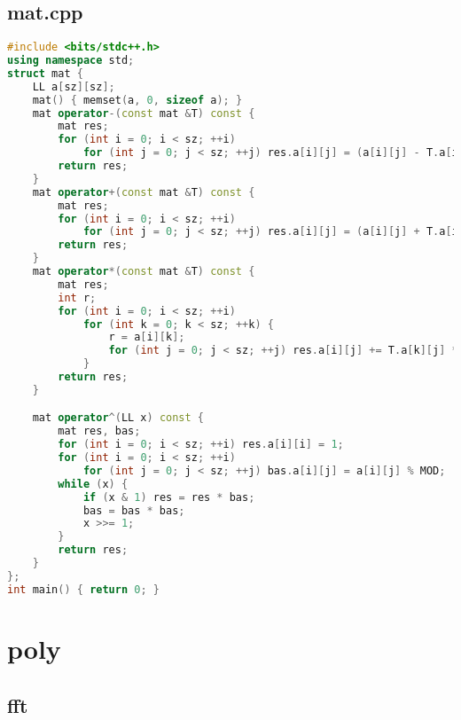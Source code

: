 \documentclass[9pt, a4paper, oneside]{book}
\begin{document}
\subsection{mat.cpp}
\begin{lstlisting}[language={C++}]
#include <bits/stdc++.h>
using namespace std;
struct mat {
    LL a[sz][sz];
    mat() { memset(a, 0, sizeof a); }
    mat operator-(const mat &T) const {
        mat res;
        for (int i = 0; i < sz; ++i)
            for (int j = 0; j < sz; ++j) res.a[i][j] = (a[i][j] - T.a[i][j]) % MOD;
        return res;
    }
    mat operator+(const mat &T) const {
        mat res;
        for (int i = 0; i < sz; ++i)
            for (int j = 0; j < sz; ++j) res.a[i][j] = (a[i][j] + T.a[i][j]) % MOD;
        return res;
    }
    mat operator*(const mat &T) const {
        mat res;
        int r;
        for (int i = 0; i < sz; ++i)
            for (int k = 0; k < sz; ++k) {
                r = a[i][k];
                for (int j = 0; j < sz; ++j) res.a[i][j] += T.a[k][j] * r, res.a[i][j] %= MOD;
            }
        return res;
    }

    mat operator^(LL x) const {
        mat res, bas;
        for (int i = 0; i < sz; ++i) res.a[i][i] = 1;
        for (int i = 0; i < sz; ++i)
            for (int j = 0; j < sz; ++j) bas.a[i][j] = a[i][j] % MOD;
        while (x) {
            if (x & 1) res = res * bas;
            bas = bas * bas;
            x >>= 1;
        }
        return res;
    }
};
int main() { return 0; }\end{lstlisting}
\section{poly}
\subsection{fft}
\end{document}
